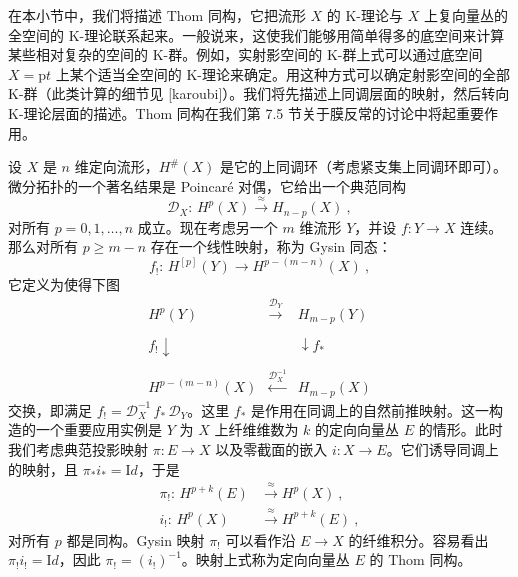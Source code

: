 \documentclass[11pt,a4paper]{ctexart}
\begin{document}
在本小节中，我们将描述 Thom 同构，它把流形 \(X\) 的 K-理论与 \(X\) 上复向量丛的全空间的 K-理论联系起来。一般说来，这使我们能够用简单得多的底空间来计算某些相对复杂的空间的 K-群。例如，实射影空间的 K-群上式可以通过底空间 \(X={\mathrm pt}\) 上某个适当全空间的 K-理论来确定。用这种方式可以确定射影空间的全部 K-群（此类计算的细节见 [karoubi]）。我们将先描述上同调层面的映射，然后转向 K-理论层面的描述。Thom 同构在我们第 7.5 节关于膜反常的讨论中将起重要作用。

设 \(X\) 是 \(n\) 维定向流形，\(H^\#(X)\) 是它的上同调环（考虑紧支集上同调环即可）。微分拓扑的一个著名结果是 Poincaré 对偶，它给出一个典范同构 \[{\mathcal D}_X:\, H^p(X)\stackrel{\approx}{\longrightarrow} H_{n-p}(X)\ ,\] 对所有 \(p=0,1,\ldots, n\) 成立。现在考虑另一个 \(m\) 维流形 \(Y\)，并设 \(f:Y\rightarrow X\) 连续。那么对所有 \(p\geq m-n\) 存在一个线性映射，称为 Gysin 同态： \[f_{!}:\,H^[p](Y)\longrightarrow H^{p-(m-n)}(X)\ ,\] 它定义为使得下图 \[{\begin{array}{ccc}
H^p(Y)&\stackrel{{\mathcal D}_Y }{\longrightarrow}&H_{m-p}(Y)\\&
&\\{\scriptstyle f_{!}}\downarrow& &\downarrow{\scriptstyle f_*}\\&
&\\H^{p-(m-n)}(X)&\stackrel{{\mathcal
D}_X^{-1}}{\longleftarrow}&H_{m-p}(X)\end{array}}\] 交换，即满足 \(f_{!}={\mathcal D}_X^{-1}\,f_*\,{\mathcal D}_Y\)。这里 \(f_*\) 是作用在同调上的自然前推映射。这一构造的一个重要应用实例是 \(Y\) 为 \(X\) 上纤维维数为 \(k\) 的定向向量丛 \(E\) 的情形。此时我们考虑典范投影映射 \(\pi:E\rightarrow X\) 以及零截面的嵌入 \(i:X\rightarrow E\)。它们诱导同调上的映射，且 \(\pi_*i_*={\mathrm Id}\)，于是 \[\begin{matrix}
\pi_{!}:\, H^{p+k}(E)&\stackrel{\approx}{\longrightarrow}
H^p(X)\ ,\\
i_{!}:\, H^p(X)&\stackrel{\approx}{\longrightarrow}
H^{p+k}(E)\ ,
\end{matrix}\] 对所有 \(p\) 都是同构。Gysin 映射 \(\pi_{!}\) 可以看作沿 \(E\to X\) 的纤维积分。容易看出 \(\pi_{!}i_{!}={\mathrm Id}\)，因此 \(\pi_{!}=(i_{!})^{-1}\)。映射上式称为定向向量丛 \(E\) 的 Thom 同构。
\end{document}
